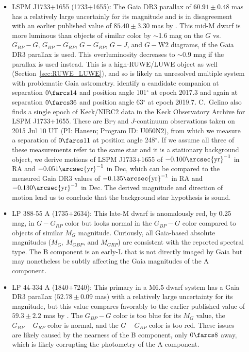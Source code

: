 \documentclass[twocolumn,tighten,twocolappendix]{aastex631}
\begin{document}
\begin{itemize}
\item LSPM J1733+1655 (1733+1655): The Gaia DR3 parallax of $60.91{\pm}0.48$ mas has a relatively large uncertainly for its magnitude and is in disagreement with an earlier published value of $85.40{\pm}3.30$ mas by \cite{dittmann2014}. This mid-M dwarf is more luminous than objects of similar color by $\sim$1.6 mag on the $G$ vs.\ $G_{BP}-G$, $G_{BP}-G_{RP}$, $G-G_{RP}$, $G-J$, and $G-$W2 diagrams, if the Gaia DR3 parallax is used. This overluminosity decreases to $\sim$0.9 mag if the \cite{dittmann2014} parallax is used instead. This is a high-RUWE/LUWE object as well (Section~\ref{sec:RUWE_LUWE}), and so is likely an unresolved multiple system with problematic Gaia astrometry. \cite{clark2022} identify a candidate companion at separation $0{\farcs}14$ and position angle 101$^\circ$ at epoch 2017.3 and again at separation $0{\farcs}36$ and position angle 63$^\circ$ at epoch 2019.7. C.\ Gelino also finds a single epoch of Keck/NIRC2 data in the Keck Observatory Archive for LSPM J1733+1655. These are Br$\gamma$ and $J$-continuum  observations taken on 2015 Jul 10 UT (PI: Hansen; Program ID: U050N2), from which we measure a separation of $0{\farcs}11$ at position angle 248$^\circ$. If we assume all three of these measurements refer to the same star and it is a stationary background object, we derive motions of LSPM J1733+1655 of $-0.100 \arcsec {\rm yr}^{-1}$ in RA and $-0.051 \arcsec {\rm yr}^{-1}$ in Dec, which can be compared to the measured Gaia DR3 values of $-0.135 \arcsec {\rm yr}^{-1}$ in RA and $-0.130 \arcsec {\rm yr}^{-1}$ in Dec. The derived magnitude and direction of motion lead us to conclude that the background star hypothesis is sound. 

\item LP 388-55 A (1735+2634): This late-M dwarf is anomalously red, by 0.25 mag, in $G-G_{RP}$ color but looks normal in the $G_{BP}-G$ color compared to objects of similar $M_G$ magnitude. Curiously, all Gaia-based absolute magnitudes ($M_G$, $M_{GBP}$, and $M_{GRP}$) are consistent with the reported spectral type. The B component is an early-L that is not directly imaged by Gaia but may nonetheless be subtly affecting the Gaia magnitudes of the A component.

\item LP 44-334 A (1840+7240): This primary in a M6.5 dwarf system has a Gaia DR3 parallax ($52.78{\pm}0.09$ mas) with a relatively large uncertainty for its magnitude, but this value compares favorably to the earlier published value of $59.3{\pm}2.2$ mas by \cite{lepine2009}. The $G_{BP}-G$ color is too blue for its $M_G$ value, the $G_{BP}-G_{RP}$ color is normal, and the $G-G_{RP}$ color is too red. These issues are likely caused by the nearness of the B component, only $0{\farcs}8$ away, which is likely corrupting the photometry of the A component.


\end{itemize}
\end{document}
